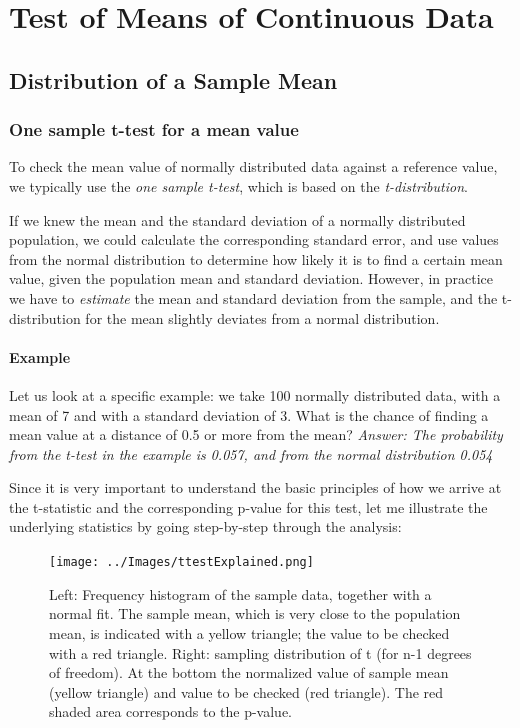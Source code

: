 \chapter{Test of Means of Continuous Data}

\section{Distribution of a Sample Mean}

\subsection{One sample t-test for a mean value} 

To check the mean value of normally distributed data against a reference value, we typically use the \emph{one sample t-test}, which is based on the \emph{t-distribution}.

If we knew the mean and the standard deviation of a normally distributed population, we could calculate the corresponding standard error, and use values from the normal distribution to determine how likely it is to find a certain mean value, given the population mean and standard deviation. However, in practice we have to \emph{estimate} the mean and standard deviation from the sample, and the t-distribution for the mean slightly deviates from a normal distribution.

\subsubsection{Example}

Let us look at a specific example: we take 100 normally distributed data, with a mean of 7 and with a standard deviation of 3.
What is the chance of finding a mean value at a distance of 0.5 or more from the mean? \emph{Answer: The probability from the t-test in the example is 0.057, and from the normal distribution 0.054}

Since it is very important to understand the basic principles of how we arrive at the t-statistic and the corresponding p-value for this test, let me illustrate the underlying statistics by going step-by-step through the analysis:

\begin{figure}
  \centering
  \texttt{[image: ../Images/ttestExplained.png]}\\
  \caption{Left: Frequency histogram of the sample data, together with a normal fit. The sample mean, which is very close to the population mean, is indicated with a yellow triangle; the value to be checked with a red triangle. Right: sampling distribution of t (for n-1 degrees of freedom). At the bottom the normalized value of sample mean (yellow triangle) and value to be checked (red triangle). The red shaded area corresponds to the p-value.}\label{fig:ttestExplained}
\end{figure}

